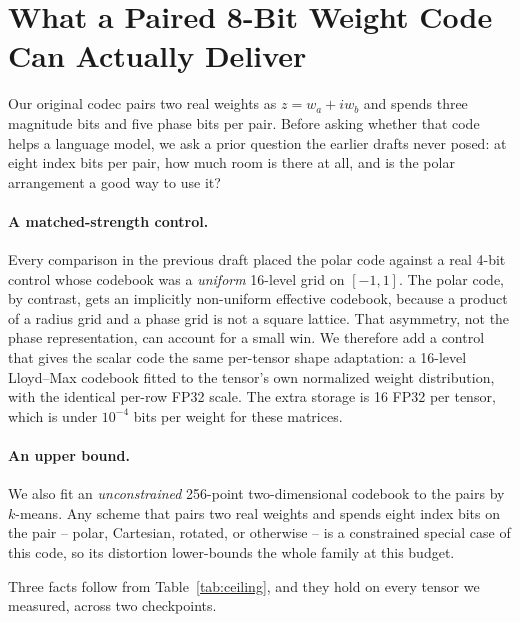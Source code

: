 
\section{What a Paired 8-Bit Weight Code Can Actually Deliver}
\label{sec:ceiling}

Our original codec pairs two real weights as $z=w_a+iw_b$ and spends three
magnitude bits and five phase bits per pair. Before asking whether that code
helps a language model, we ask a prior question the earlier drafts never posed:
at eight index bits per pair, how much room is there at all, and is the polar
arrangement a good way to use it?

\paragraph{A matched-strength control.} Every comparison in the previous draft
placed the polar code against a real 4-bit control whose codebook was a
\emph{uniform} 16-level grid on $[-1,1]$. The polar code, by contrast, gets an
implicitly non-uniform effective codebook, because a product of a radius grid
and a phase grid is not a square lattice. That asymmetry, not the phase
representation, can account for a small win. We therefore add a control that
gives the scalar code the same per-tensor shape adaptation: a 16-level
Lloyd--Max codebook fitted to the tensor's own normalized weight
distribution, with the identical per-row FP32 scale. The extra storage is 16
FP32 per tensor, which is under $10^{-4}$ bits per weight for these matrices.

\paragraph{An upper bound.} We also fit an \emph{unconstrained} 256-point
two-dimensional codebook to the pairs by $k$-means. Any scheme that pairs two
real weights and spends eight index bits on the pair -- polar, Cartesian,
rotated, or otherwise -- is a constrained special case of this code, so its
distortion lower-bounds the whole family at this budget.



Three facts follow from Table~\ref{tab:ceiling}, and they hold on every tensor
we measured, across two checkpoints.

